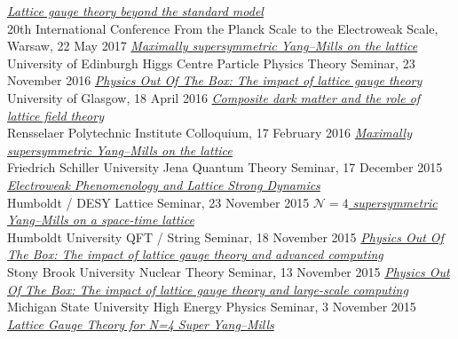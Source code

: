 \begin{spacelist}
\begin{revnumerate}
    \pagebreakitem
      \textit{\href{http://www.davidschaich.net/talks/1705Planck.pdf}{Lattice gauge theory beyond the standard model}} \\
      20th International Conference From the Planck Scale to the Electroweak Scale, Warsaw, 22 May 2017
    \pagebreakitem
      \textit{\href{http://www.davidschaich.net/talks/1611Edinburgh.pdf}{Maximally supersymmetric Yang--Mills on the lattice}} \\
      University of Edinburgh Higgs Centre Particle Physics Theory Seminar, 23 November 2016
    \pagebreakitem
      \textit{\href{http://www.davidschaich.net/talks/1604Glasgow.pdf}{Physics Out Of The Box: The impact of lattice gauge theory}} \\
      University of Glasgow, 18 April 2016
    \pagebreakitem
      \textit{\href{http://www.davidschaich.net/talks/1602RPI.pdf}{Composite dark matter and the role of lattice field theory}} \\
      Rensselaer Polytechnic Institute Colloquium, 17 February 2016
    \pagebreakitem
      \textit{\href{http://www.davidschaich.net/talks/1512Jena.pdf}{Maximally supersymmetric Yang--Mills on the lattice}} \\
      Friedrich Schiller University Jena Quantum Theory Seminar, 17 December 2015
    \pagebreakitem
      \textit{\href{http://www.davidschaich.net/talks/151123Humboldt.pdf}{Electroweak Phenomenology and Lattice Strong Dynamics}} \\
      Humboldt / DESY Lattice Seminar, 23 November 2015
    \pagebreakitem
      \textit{\href{http://www.davidschaich.net/talks/151118Humboldt.pdf}{$\mathcal N = 4$ supersymmetric Yang--Mills on a space-time lattice}} \\
      Humboldt University QFT / String Seminar, 18 November 2015
    \pagebreakitem
      \textit{\href{http://www.davidschaich.net/talks/1511StonyBrook.pdf}{Physics Out Of The Box: The impact of lattice gauge theory and advanced computing}} \\
      Stony Brook University Nuclear Theory Seminar, 13 November 2015
    \pagebreakitem
      \textit{\href{http://www.davidschaich.net/talks/1511MSU.pdf}{Physics Out Of The Box: The impact of lattice gauge theory and large-scale computing}} \\
      Michigan State University High Energy Physics Seminar, 3 November 2015
    \pagebreakitem
      \textit{\href{http://www.davidschaich.net/talks/1509KITP.pdf}{Lattice Gauge Theory for N=4 Super Yang--Mills}} \\

\end{revnumerate}
\end{spacelist}
